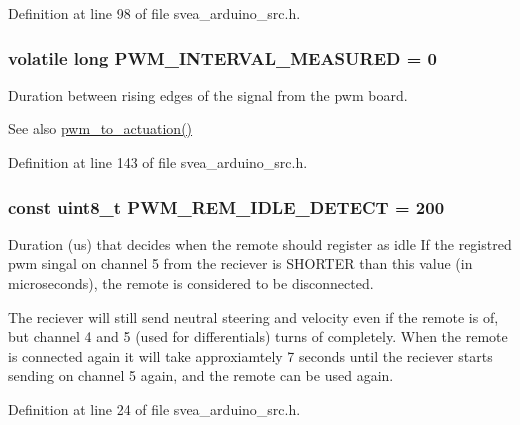 Definition at line 98 of file svea\+\_\+arduino\+\_\+src.\+h.

\subsubsection[{\texorpdfstring{P\+W\+M\+\_\+\+I\+N\+T\+E\+R\+V\+A\+L\+\_\+\+M\+E\+A\+S\+U\+R\+ED}{PWM_INTERVAL_MEASURED}}]{\setlength{\rightskip}{0pt plus 5cm}volatile long P\+W\+M\+\_\+\+I\+N\+T\+E\+R\+V\+A\+L\+\_\+\+M\+E\+A\+S\+U\+R\+ED = 0}\hypertarget{group__GlobalVariables_ga313a0dafc729c2dbc7cbaf993c734f56}{}\label{group__GlobalVariables_ga313a0dafc729c2dbc7cbaf993c734f56}


Duration between rising edges of the signal from the pwm board. 

\begin{DoxySeeAlso}{See also}
\hyperlink{group__GlobalVariables_gaf4fdc44b265856b40c792260af0975f1}{pwm\+\_\+to\+\_\+actuation()} 
\end{DoxySeeAlso}


Definition at line 143 of file svea\+\_\+arduino\+\_\+src.\+h.

\subsubsection[{\texorpdfstring{P\+W\+M\+\_\+\+R\+E\+M\+\_\+\+I\+D\+L\+E\+\_\+\+D\+E\+T\+E\+CT}{PWM_REM_IDLE_DETECT}}]{\setlength{\rightskip}{0pt plus 5cm}const uint8\+\_\+t P\+W\+M\+\_\+\+R\+E\+M\+\_\+\+I\+D\+L\+E\+\_\+\+D\+E\+T\+E\+CT = 200}\hypertarget{group__GlobalVariables_ga81d1b4d200caa7d8d9694709e96f1074}{}\label{group__GlobalVariables_ga81d1b4d200caa7d8d9694709e96f1074}


Duration (us) that decides when the remote should register as idle If the registred pwm singal on channel 5 from the reciever is S\+H\+O\+R\+T\+ER than this value (in microseconds), the remote is considered to be disconnected. 

The reciever will still send neutral steering and velocity even if the remote is of, but channel 4 and 5 (used for differentials) turns of completely. When the remote is connected again it will take approxiamtely 7 seconds until the reciever starts sending on channel 5 again, and the remote can be used again. 

Definition at line 24 of file svea\+\_\+arduino\+\_\+src.\+h.

